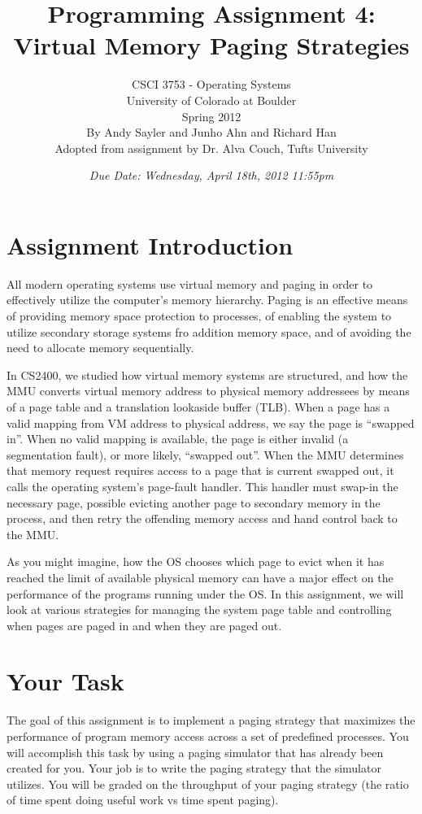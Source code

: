 \documentclass[12pt]{article}
\title{Programming Assignment 4:\\Virtual Memory Paging Strategies}
\author{
  CSCI 3753 - Operating Systems\\
  University of Colorado at Boulder\\
  Spring 2012\\
  By Andy Sayler and Junho Ahn and Richard Han\\
  Adopted from assignment by Dr. Alva Couch, Tufts University\cite{couch-a5}
}
\date{\emph{Due Date: Wednesday, April 18th, 2012 11:55pm}}
\begin{document}
\maketitle

\section{Assignment Introduction}

All modern operating systems use virtual memory and paging in order to
effectively utilize the computer's memory hierarchy. Paging is an
effective means of providing memory space protection to processes, of
enabling the system to utilize secondary storage systems fro addition
memory space, and of avoiding the need to allocate memory sequentially.

In CS2400, we
studied how virtual memory systems are structured, and how the MMU
converts virtual memory address to physical memory addressees by
means of a page table and a translation lookaside buffer (TLB). When a
page has a valid mapping from VM address to physical address, we say
the page is ``swapped in''. When no valid mapping is available, the page
is either invalid (a segmentation fault), or more likely, ``swapped
out''. When the MMU determines that memory request requires access to
a page that is current swapped out, it calls the operating system's
page-fault handler. This handler must swap-in the necessary page,
possible evicting another page to secondary memory in the process, and then retry the
offending memory access and hand control back to the MMU.

As you might imagine, how the OS chooses which page to evict when it
has reached the limit of available physical memory can have a major
effect on the performance of the programs running under the OS.
In this assignment, we will look at various strategies for managing
the system page table and controlling when pages are paged in and when
they are paged out.

\section{Your Task}

The goal of this assignment is to implement a paging strategy that
maximizes the performance of program memory access across a
set of predefined processes. You will accomplish this task by using a
paging simulator that has already been created for you. Your job is to
write the paging strategy that the simulator utilizes. You will be graded
on the throughput of your paging strategy (the ratio of time spent doing
useful work vs time spent paging).
\end{document}
